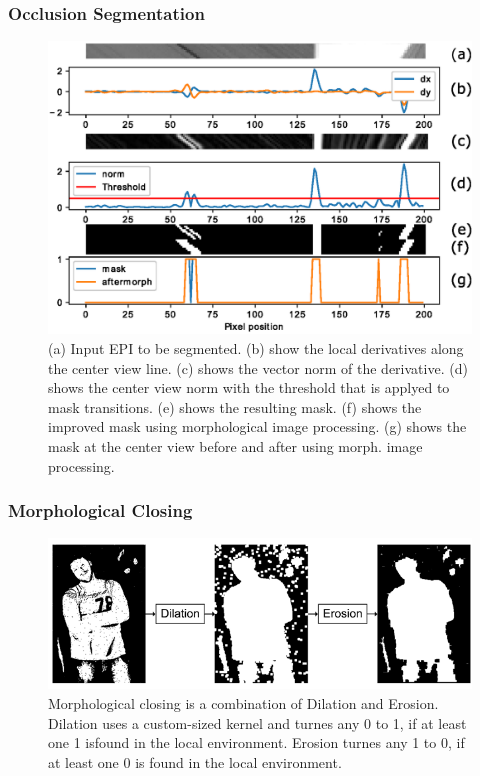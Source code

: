 \documentclass[11pt]{beamer}
\begin{document}
\begin{frame}
\frametitle{Occlusion Segmentation}
\begin{figure}
	\centering
	\includegraphics[width=1\linewidth]{images/derivatives_full}
	\caption[Segmentating an EPI]{(a) Input EPI to be segmented. (b) show the local derivatives along the center view line. (c) shows the vector norm of the derivative. (d) shows the center view norm with the threshold that is applyed to mask transitions. (e) shows the resulting mask. (f) shows the improved mask using morphological image processing. (g) shows the mask at the center view before and after using morph. image processing. }
	\label{fig:derivativesfull}
	
\end{figure}
\end{frame}

\begin{frame}
\frametitle{Morphological Closing}
\begin{figure}
	\centering
	\includegraphics[width=0.7\linewidth]{images/closing}
	\caption[Morphological closing]{Morphological closing is a combination of Dilation and Erosion. Dilation uses a custom-sized kernel and turnes any 0 to 1, if at least one 1 isfound in the local environment. Erosion turnes any 1 to 0, if at least one 0 is found in the local environment.}
	\label{fig:closing}
\end{figure}
\end{frame}
\end{document}
